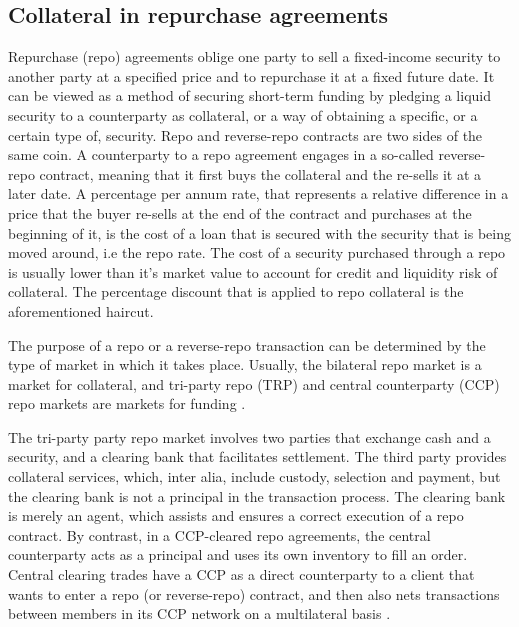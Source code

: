 \documentclass[11pt,a4paper,english,oneside]{article}
\begin{document}
\subsection{Collateral in repurchase agreements}

Repurchase (repo) agreements oblige one party to sell a fixed-income security to another party at a specified price and to repurchase it at a fixed future date. It can be viewed as a method of securing short-term funding by pledging a liquid security to a counterparty as collateral, or a way of obtaining a specific, or a certain type of, security. Repo and reverse-repo contracts are two sides of the same coin. A counterparty to a repo agreement engages in a so-called reverse-repo contract, meaning that it first buys the collateral and the re-sells it at a later date. A percentage per annum rate, that represents a relative difference in a price that the buyer re-sells at the end of the contract and purchases at the beginning of it, is the cost of a loan that is secured with the security that is being moved around, i.e the repo rate. The cost of a security purchased through a repo is usually lower than it's market value to account for credit and liquidity risk of collateral. The percentage discount that is applied to repo collateral is the aforementioned haircut.

The purpose of a repo or a reverse-repo transaction can be determined by the type of market in which it takes place. Usually, the bilateral repo market is a market for collateral, and tri-party repo (TRP) and central counterparty (CCP) repo markets are markets for funding \citep{singh2020}.

The tri-party party repo market involves two parties that exchange cash and a security, and a clearing bank that facilitates settlement. The third party provides collateral services, which, inter alia, include custody, selection and payment, but the clearing bank is not a principal in the transaction process. The clearing bank is merely an agent, which assists and ensures a correct execution of a repo contract. By contrast, in a CCP-cleared repo agreements, the central counterparty acts as a principal and uses its own inventory to fill an order. Central clearing trades have a CCP as a direct counterparty to a client that wants to enter a repo (or reverse-repo) contract, and then also nets transactions between members in its CCP network on a multilateral basis \citep{aguiar2016}.
\end{document}
